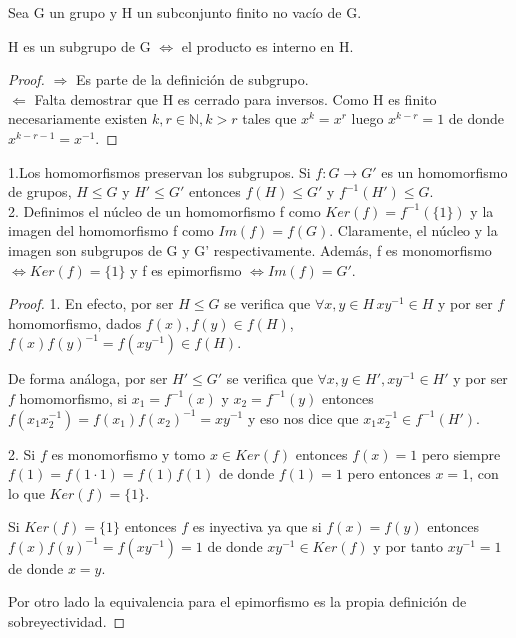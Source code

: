 \begin{proposition}
Sea G un grupo y H un subconjunto finito no vacío de G. 

H es un subgrupo de G $\iff$ el producto es interno en H.
\end{proposition}

\begin{proof}
$\Rightarrow$ Es parte de la definición de subgrupo. \\
$\Leftarrow$ Falta demostrar que H es cerrado para inversos. Como H es finito necesariamente existen $k,r \in \mathbb{N}, k>r$ tales que $x^k = x^r$ luego $x^{k-r} = 1$ de donde $x^{k-r-1} = x^{-1}$. 
\end{proof}

\begin{proposition}
1.Los homomorfismos preservan los subgrupos. Si $f:G \rightarrow G'$ es un homomorfismo de grupos, $H \le G$ y $H' \le G'$ entonces $f(H) \le G'$ y $f^{-1}(H') \le G$.\\
2. Definimos el núcleo de un homomorfismo f como $Ker(f) = f^{-1}(\{1\})$ y la imagen del homomorfismo f como $Im(f) = f(G)$. Claramente, el núcleo y la imagen son subgrupos de G y G' respectivamente. Además, f es monomorfismo $\iff Ker(f) = \{1\}$ y f es epimorfismo $\iff Im(f) = G'$.
\end{proposition}
\begin{proof}
1. En efecto, por ser $H \le G$ se verifica que $\forall x,y \in H \, xy^{-1} \in H$ y por ser $f$ homomorfismo, dados $f(x),f(y) \in f(H)$, $f(x)f(y)^{-1} = f(xy^{-1}) \in f(H)$. 

De forma análoga, por ser $H' \le G'$ se verifica que $\forall x,y \in H', xy^{-1} \in H'$ y por ser $f$ homomorfismo, si $x_1 = f^{-1}(x)$ y $x_2 = f^{-1}(y)$ entonces $f(x_1x_2^{-1}) = f(x_1)f(x_2)^{-1} = xy^{-1}$ y eso nos dice que $x_1x_2^{-1} \in f^{-1}(H')$.

2. Si $f$ es monomorfismo y tomo $x \in Ker(f)$ entonces $f(x) = 1$ pero siempre $f(1) = f(1 \cdot 1) = f(1)f(1)$ de donde $f(1) = 1$ pero entonces $x = 1$, con lo que $Ker(f) = \{1\}$.

Si $Ker(f) = \{1\}$ entonces $f$ es inyectiva ya que si $f(x) = f(y)$ entonces $f(x)f(y)^{-1} = f(xy^{-1}) = 1$ de donde $xy^{-1} \in Ker(f)$ y por tanto $xy^{-1} = 1$ de donde $x = y$.

Por otro lado la equivalencia para el epimorfismo es la propia definición de sobreyectividad.
\end{proof}

